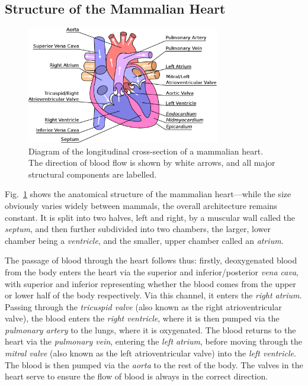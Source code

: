 \documentclass[../thesis-main.tex]{subfiles}
\begin{document}
 \subsection{Structure of the Mammalian Heart}
 \label{subsec:heart-structure}
 \begin{figure}
  \centering
  \includegraphics[width=0.75\textwidth]{heart_labels}
  \caption[Structure of the mammalian heart]{Diagram of the longitudinal cross-section of a mammalian heart. The direction of blood flow is shown by white arrows, and all major structural components are labelled.}
  \label{fig:heart-structure}
 \end{figure}
 Fig.~\ref{fig:heart-structure} shows the anatomical structure of the mammalian heart---while the size obviously varies widely between mammals, the overall architecture remains constant. It is split into two halves, left and right, by a muscular wall called the \emph{septum}, and then further subdivided into two chambers, the larger, lower chamber being a \emph{ventricle}, and the smaller, upper chamber called an \emph{atrium}.
 
 The passage of blood through the heart follows thus: firstly, deoxygenated blood from the body enters the heart via the superior and inferior/posterior \emph{vena cava}, with superior and inferior representing whether the blood comes from the upper or lower half of the body respectively. Via this channel, it enters the \emph{right atrium}. Passing through the \emph{tricuspid valve} (also known as the right atrioventricular valve), the blood enters the \emph{right ventricle}, where it is then pumped via the \emph{pulmonary artery} to the lungs, where it is oxygenated. The blood returns to the heart via the \emph{pulmonary vein}, entering the \emph{left atrium}, before moving through the \emph{mitral valve} (also known as the left atrioventricular valve) into the \emph{left ventricle}. The blood is then pumped via the \emph{aorta} to the rest of the body. The valves in the heart serve to ensure the flow of blood is always in the correct direction.
 
\end{document}
